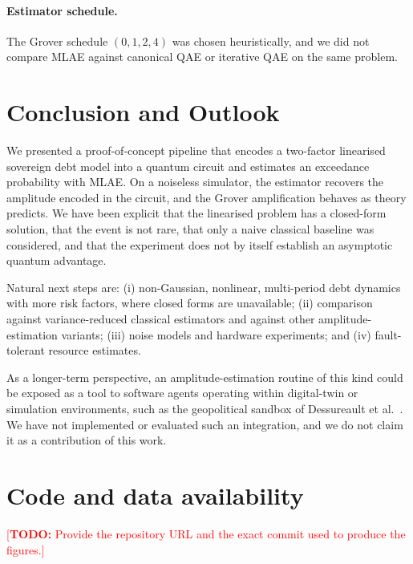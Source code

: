 \documentclass[pdflatex,sn-mathphys-num]{sn-jnl}%
\newcommand{\todo}[1]{\textcolor{red}{[\textbf{TODO:} #1]}}
\theoremstyle{thmstyleone}%
\theoremstyle{thmstyletwo}%
\theoremstyle{thmstylethree}%
\begin{document}
\paragraph{Estimator schedule.} The Grover schedule $(0,1,2,4)$ was chosen heuristically, and we did not compare MLAE against canonical QAE or iterative QAE on the same problem.

\section{Conclusion and Outlook}\label{sec4}

We presented a proof-of-concept pipeline that encodes a two-factor linearised sovereign debt model into a quantum circuit and estimates an exceedance probability with MLAE. On a noiseless simulator, the estimator recovers the amplitude encoded in the circuit, and the Grover amplification behaves as theory predicts. We have been explicit that the linearised problem has a closed-form solution, that the event is not rare, that only a naive classical baseline was considered, and that the experiment does not by itself establish an asymptotic quantum advantage.

Natural next steps are: (i) non-Gaussian, nonlinear, multi-period debt dynamics with more risk factors, where closed forms are unavailable; (ii) comparison against variance-reduced classical estimators and against other amplitude-estimation variants; (iii) noise models and hardware experiments; and (iv) fault-tolerant resource estimates.

As a longer-term perspective, an amplitude-estimation routine of this kind could be exposed as a tool to software agents operating within digital-twin or simulation environments, such as the geopolitical sandbox of Dessureault et al.\ \cite{dessureault2026evaluating}. We have not implemented or evaluated such an integration, and we do not claim it as a contribution of this work.

\section*{Code and data availability}
\todo{Provide the repository URL and the exact commit used to produce the figures.}

\end{document}
